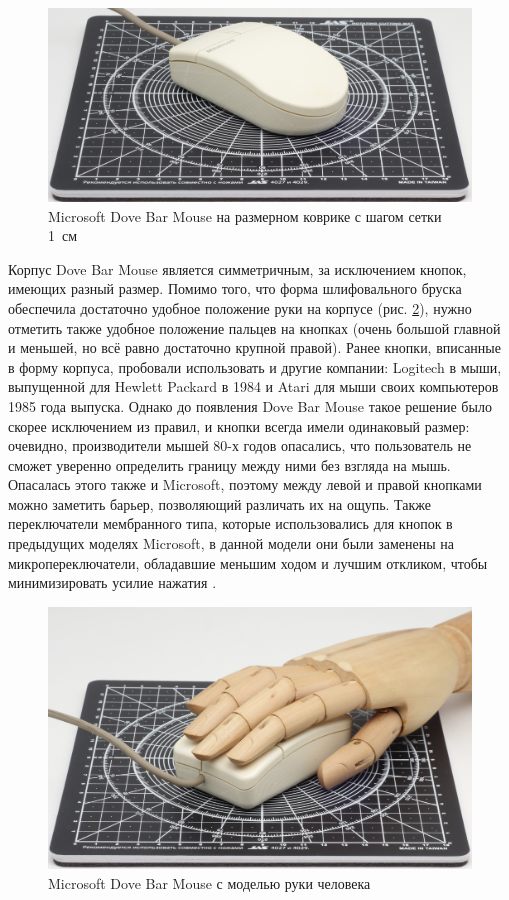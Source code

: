 \documentclass[11pt, a4paper]{article}
\begin{document}
\begin{figure}[h]
    \centering
    \includegraphics[scale=0.5]{1987_microsoft_dove_bar_mouse/size.jpg}
    \caption{Microsoft Dove Bar Mouse на размерном коврике с шагом сетки 1~см}
    \label{fig:MicrosoftDoveBarSize}
\end{figure}

Корпус Dove Bar Mouse является симметричным, за исключением кнопок, имеющих разный размер. Помимо того, что форма шлифовального бруска обеспечила достаточно удобное положение руки на корпусе (рис. \ref{fig:MicrosoftDoveBarHand}), нужно отметить также удобное положение пальцев на кнопках (очень большой главной и меньшей, но всё равно достаточно крупной правой). Ранее кнопки, вписанные в форму корпуса, пробовали использовать и другие компании: Logitech в мыши, выпущенной для Hewlett Packard в 1984 и Atari для мыши своих компьютеров 1985 года выпуска. Однако до появления Dove Bar Mouse такое решение было скорее исключением из правил, и кнопки всегда имели одинаковый размер: очевидно, производители мышей 80-х годов опасались, что пользователь не сможет уверенно определить границу между ними без взгляда на мышь. Опасалась этого также и Microsoft, поэтому между левой и правой кнопками можно заметить барьер, позволяющий различать их на ощупь. Также переключатели мембранного типа, которые использовались для кнопок в предыдущих моделях Microsoft, в данной модели они были заменены на микропереключатели, обладавшие меньшим ходом и лучшим откликом, чтобы минимизировать усилие нажатия \cite{doveBarMousePcMag3, doveBarDesign2}.

\begin{figure}[h]
    \centering
    \includegraphics[scale=0.45]{1987_microsoft_dove_bar_mouse/hand.jpg}
    \caption{Microsoft Dove Bar Mouse с моделью руки человека}
    \label{fig:MicrosoftDoveBarHand}
\end{figure}
\end{document}
